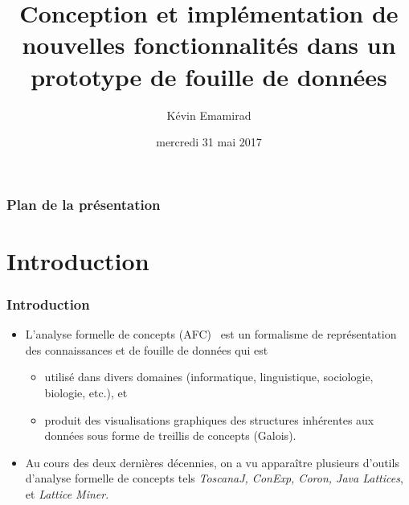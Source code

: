 \documentclass[french]{beamer}
\title[Lattice Miner]{Conception et implémentation de nouvelles fonctionnalités dans un prototype de fouille de données} %
\author{Kévin Emamirad} %
\institute[UQO] %
{
Université du Québec en Outaouais \\ %
Département d’informatique et d’ingénierie \\
\medskip
\textit{emak01@uqo.ca} %
}
\date{mercredi 31 mai 2017} %
\begin{document}
\begin{frame}
\titlepage %
\end{frame}

\begin{frame}
\frametitle{Plan de la présentation} %
\tableofcontents %
\end{frame}

\section{Introduction}

\begin{frame}
\frametitle{Introduction}
\begin{itemize}
\item L'analyse formelle de concepts (AFC)~\parencite{Ganter1999}
est un formalisme de représentation des connaissances et de fouille de données qui est
\begin{itemize}
\item utilisé dans divers domaines (informatique, linguistique, sociologie, biologie, etc.), et
\item produit des visualisations graphiques des structures inhérentes aux données sous forme de treillis de concepts (Galois).
\end{itemize}
\item Au cours des deux dernières décennies, on a vu apparaître plusieurs d'outils d'analyse formelle de concepts tels \emph{ToscanaJ, ConExp, Coron, Java Lattices}, et \emph{Lattice Miner}.
\end{itemize}
\end{frame}
\end{document}
